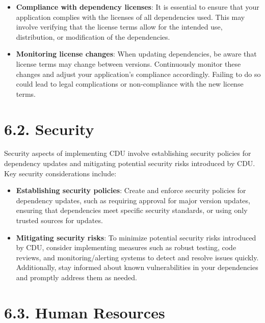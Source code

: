 \documentclass[10pt]{article}
\begin{document}
\begin{itemize}

  \item \textbf{Compliance with dependency licenses}: It is essential to ensure that your application complies with the licenses of all dependencies used. This may involve verifying that the license terms allow for the intended use, distribution, or modification of the dependencies.

  \item \textbf{Monitoring license changes}: When updating dependencies, be aware that license terms may change between versions. Continuously monitor these changes and adjust your application's compliance accordingly. Failing to do so could lead to legal complications or non-compliance with the new license terms.

\end{itemize}

\section*{6.2. Security}

Security aspects of implementing CDU involve establishing security policies for dependency updates and mitigating potential security risks introduced by CDU. Key security considerations include:

\begin{itemize}

  \item \textbf{Establishing security policies}: Create and enforce security policies for dependency updates, such as requiring approval for major version updates, ensuring that dependencies meet specific security standards, or using only trusted sources for updates.

  \item \textbf{Mitigating security risks}: To minimize potential security risks introduced by CDU, consider implementing measures such as robust testing, code reviews, and monitoring/alerting systems to detect and resolve issues quickly. Additionally, stay informed about known vulnerabilities in your dependencies and promptly address them as needed.

\end{itemize}

\section*{6.3. Human Resources}
\end{document}
